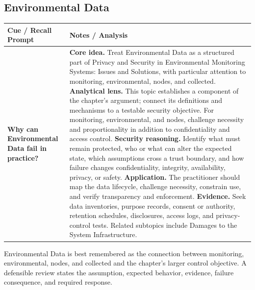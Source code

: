\documentclass[11pt]{article}
\newcommand{\CornellHeader}{%
\rowcolor{Navy}\color{white}\bfseries Cue / Recall Prompt & \color{white}\bfseries Notes / Analysis\\\hline}
\newcommand{\CornellRow}[2]{%
\cellcolor{CueGray}\RaggedRight\textbf{#1} & \RaggedRight #2\\\hline}
\begin{document}
\subsection*{Environmental Data}
\begin{longtable}{>{\RaggedRight\arraybackslash}p{}|>{\RaggedRight\arraybackslash}p{}}
\CornellHeader
\CornellRow{Why can Environmental Data fail in practice?}{\textbf{Core idea.} Treat Environmental Data as a structured part of Privacy and Security in Environmental Monitoring Systems: Issues and Solutions, with particular attention to monitoring, environmental, nodes, and collected. \textbf{Analytical lens.} This topic establishes a component of the chapter's argument; connect its definitions and mechanisms to a testable security objective. For monitoring, environmental, and nodes, challenge necessity and proportionality in addition to confidentiality and access control. \textbf{Security reasoning.} Identify what must remain protected, who or what can alter the expected state, which assumptions cross a trust boundary, and how failure changes confidentiality, integrity, availability, privacy, or safety. \textbf{Application.} The practitioner should map the data lifecycle, challenge necessity, constrain use, and verify transparency and enforcement. \textbf{Evidence.} Seek data inventories, purpose records, consent or authority, retention schedules, disclosures, access logs, and privacy-control tests. Related subtopics include Damages to the System Infrastructure.}
\end{longtable}
\begin{topicsummary}
Environmental Data is best remembered as the connection between monitoring, environmental, nodes, and collected and the chapter's larger control objective. A defensible review states the assumption, expected behavior, evidence, failure consequence, and required response.
\end{topicsummary}
\end{document}
